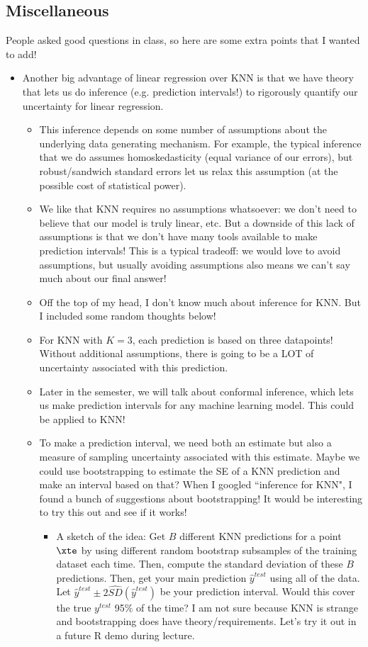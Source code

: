 \subsection{Miscellaneous}

People asked good questions in class, so here are some extra points that I wanted to add! 

\begin{itemize}
\item Another big advantage of linear regression over KNN is that we have theory that lets us do inference (e.g. prediction intervals!) to rigorously quantify our uncertainty for linear regression. 
\begin{itemize}
\item This inference depends on some number of assumptions about the underlying data generating mechanism. For example, the typical inference that we do assumes homoskedasticity (equal variance of our errors), but robust/sandwich standard errors let us relax this assumption (at the possible cost of statistical power). 
\item We like that KNN requires no assumptions whatsoever: we don't need to believe that our model is truly linear, etc. But a downside of this lack of assumptions is that we don't have many tools available to make prediction intervals! This is a typical tradeoff: we would love to avoid assumptions, but usually avoiding assumptions also means we can't say much about our final answer!
\item Off the top of my head, I don't know much about inference for KNN. But I included some random thoughts below! 
\item For KNN with $K=3$, each prediction is based on three datapoints! Without additional assumptions, there is going to be a LOT of uncertainty associated with this prediction. 
\item Later in the semester, we will talk about conformal inference, which lets us make prediction intervals for any machine learning model. This could be applied to KNN!
\item To make a prediction interval, we need both an estimate but also a measure  of sampling uncertainty associated with this estimate. Maybe we could use bootstrapping to estimate the SE of a KNN prediction and make an interval based on that? When I googled ``inference for KNN", I found a bunch of suggestions about bootstrapping! It would be interesting to try this out and see if it works! 
\begin{itemize}
\item A sketch of the idea: Get $B$ different KNN predictions for a point $\xte$ by using different random bootstrap subsamples of the training dataset each time. Then, compute the standard deviation of these $B$ predictions. Then, get your main prediction $\hat{y}^{test}$ using all of the data. Let $\hat{y}^{test} \pm 2 \hat{SD}(\hat{y}^{test})$ be your prediction interval. Would this cover the true $y^{test}$ 95\% of the time? I am not sure because KNN is strange and bootstrapping does have theory/requirements. Let's try it out in a future R demo during lecture. 

\end{itemize}
\end{itemize}
\end{itemize}
